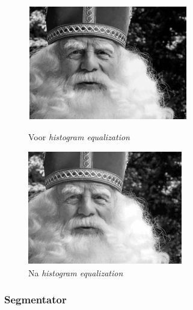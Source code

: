\begin{figure}[H]
    \begin{minipage}{0.45\textwidth}
        \includegraphics[width=\linewidth]{figures/sint-before.png}
        \caption{Voor \emph{histogram equalization}}
        \label{fig:sinterklaas1}
    \end{minipage}
    \begin{minipage}{0.45\textwidth}
        \includegraphics[width=\linewidth]{figures/sint-after.png}
        \caption{Na \emph{histogram equalization}}
        \label{fig:sinterklaas2}
    \end{minipage}
\end{figure}

\subsubsection{Segmentator}

